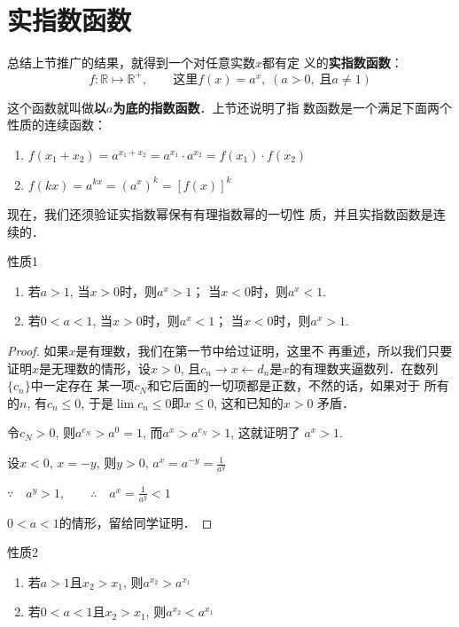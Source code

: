 \section{实指数函数}
总结上节推广的结果，就得到一个对任意实数$x$都有定
义的\textbf{实指数函数}：
\[f:\mathbb{R}\mapsto \mathbb{R}^+,\qquad \text{这里} f(x)=a^x,\; (a>0, \; \text{且}a\ne 1)\]

这个函数就叫做\textbf{以$a$为底的指数函数}．上节还说明了指
数函数是一个满足下面两个性质的连续函数：
\begin{enumerate}
  \item $f(x_1+x_2)=a^{x_1+x_2}=a^{x_1}\cdot a^{x_2}=f(x_1)\cdot f(x_2)$
  \item $f(kx)=a^{kx}=(a^x)^k=[f(x)]^k$
\end{enumerate}

现在，我们还须验证实指数幂保有有理指数幂的一切性
质，并且实指数函数是连续的．

\begin{blk}{性质1}
\begin{enumerate}
  \item 若$a>1$, 当$x>0$时，则$a^x>1$；
当$x<0$时，则$a^x<1$.
\item 若$0<a<1$, 当$x>0$时，则$a^x<1$； 
当$x<0$时，则$a^x>1$.
\end{enumerate}
\end{blk}

\begin{proof}
  如果$x$是有理数，我们在第一节中给过证明，这里不
再重述，所以我们只要证明$x$是无理数的情形，设$x>0$,
且$c_n\to x\leftarrow d_n$是$x$的有理数夹逼数列．在数列$\{c_n\}$中一定存在
某一项$c_N$和它后面的一切项都是正数，不然的话，如果对于
所有的$n$, 有$c_n\le 0$, 于是$\lim c_n\le 0$即$x\le 0$, 这和已知的$x>0$
矛盾．

令$c_N>0$, 则$a^{c_N}>a^0=1$, 而$a^x>a^{c_N}>1$, 这就证明了
$a^x>1$.

设$x<0$, $x=-y$, 则$y>0$, $a^x=a^{-y}=\frac{1}{a^y}$

$\because\quad a^y>1,\qquad \therefore\quad a^x=\frac{1}{a^y}<1$

$0<a<1$的情形，留给同学证明．
\end{proof}

\begin{blk}{性质2}
\begin{enumerate}
  \item 若$a>1$且$x_2>x_1$, 则$a^{x_2}>a^{x_1}$
  \item 若$0<a<1$且$x_2>x_1$, 则$a^{x_2}<a^{x_1}$
\end{enumerate}
\end{blk}


